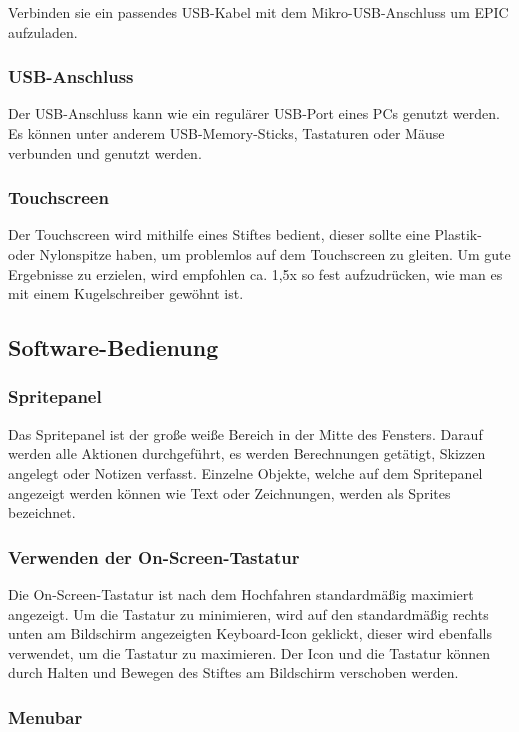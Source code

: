 Verbinden sie ein passendes USB-Kabel mit dem Mikro-USB-Anschluss um EPIC aufzuladen. 

\subsubsection{USB-Anschluss}

Der USB-Anschluss kann wie ein regulärer USB-Port eines PCs genutzt werden. Es können unter anderem USB-Memory-Sticks, Tastaturen oder Mäuse verbunden und genutzt werden.

\subsubsection{Touchscreen}

Der Touchscreen wird mithilfe eines Stiftes bedient, dieser sollte eine Plastik- oder Nylonspitze haben, um problemlos auf dem Touchscreen zu gleiten. Um gute Ergebnisse zu erzielen, wird empfohlen ca. 1,5x so fest aufzudrücken, wie man es mit einem Kugelschreiber gewöhnt ist. 

\subsection{Software-Bedienung}

\subsubsection{Spritepanel}
Das Spritepanel ist der große weiße Bereich in der Mitte des Fensters. Darauf werden alle Aktionen durchgeführt, es werden Berechnungen getätigt, Skizzen angelegt oder Notizen verfasst. Einzelne Objekte, welche auf dem Spritepanel angezeigt werden können wie Text oder Zeichnungen, werden als Sprites bezeichnet.

\subsubsection{Verwenden der On-Screen-Tastatur}

Die On-Screen-Tastatur ist nach dem Hochfahren standardmäßig maximiert angezeigt. Um die Tastatur zu minimieren, wird auf den standardmäßig rechts unten am Bildschirm angezeigten Keyboard-Icon geklickt, dieser wird ebenfalls verwendet, um die Tastatur zu maximieren. Der Icon und die Tastatur können durch Halten und Bewegen des Stiftes am Bildschirm verschoben werden.


\subsubsection{Menubar}

